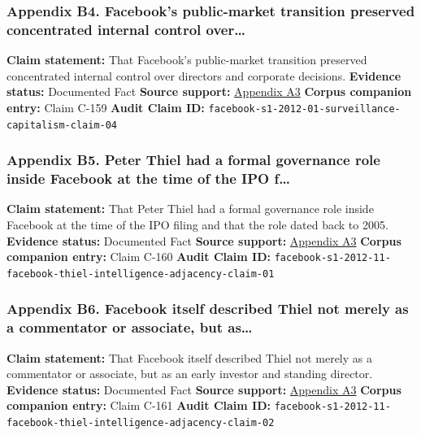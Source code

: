 \documentclass[
  american,
  11pt,
  letterpaper,
]{article}
\begin{document}
\subsubsection{Appendix B4. Facebook's public-market transition
preserved concentrated internal control
over\ldots{}}\label{ch-01-appendix-b4-facebook-s-public-market-transition-preserved-concentrated-internal-control-over}

\textbf{Claim statement:} That Facebook's public-market transition
preserved concentrated internal control over directors and corporate
decisions. \textbf{Evidence status:} Documented Fact \textbf{Source
support:}
\hyperref[ch-01-appendix-a3-facebook-inc-registration-statement-on-form-s-1]{Appendix
A3} \textbf{Corpus companion entry:} Claim C-159 \textbf{Audit Claim
ID:} \texttt{facebook-s1-2012-01-surveillance-capitalism-claim-04}

\subsubsection{Appendix B5. Peter Thiel had a formal governance role
inside Facebook at the time of the IPO
f\ldots{}}\label{ch-01-appendix-b5-peter-thiel-had-a-formal-governance-role-inside-facebook-at-the-time-of-the-ipo-f}

\textbf{Claim statement:} That Peter Thiel had a formal governance role
inside Facebook at the time of the IPO filing and that the role dated
back to 2005. \textbf{Evidence status:} Documented Fact \textbf{Source
support:}
\hyperref[ch-01-appendix-a3-facebook-inc-registration-statement-on-form-s-1]{Appendix
A3} \textbf{Corpus companion entry:} Claim C-160 \textbf{Audit Claim
ID:}
\texttt{facebook-s1-2012-11-facebook-thiel-intelligence-adjacency-claim-01}

\subsubsection{Appendix B6. Facebook itself described Thiel not merely
as a commentator or associate, but
as\ldots{}}\label{ch-01-appendix-b6-facebook-itself-described-thiel-not-merely-as-a-commentator-or-associate-but-as}

\textbf{Claim statement:} That Facebook itself described Thiel not
merely as a commentator or associate, but as an early investor and
standing director. \textbf{Evidence status:} Documented Fact
\textbf{Source support:}
\hyperref[ch-01-appendix-a3-facebook-inc-registration-statement-on-form-s-1]{Appendix
A3} \textbf{Corpus companion entry:} Claim C-161 \textbf{Audit Claim
ID:}
\texttt{facebook-s1-2012-11-facebook-thiel-intelligence-adjacency-claim-02}
\end{document}
